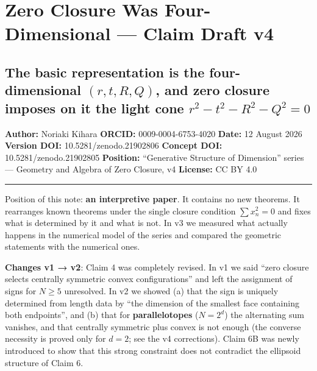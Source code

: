 \documentclass[
  10pt,
]{article}
\author{}
\date{}
\begin{document}
{
\setcounter{tocdepth}{3}
\tableofcontents
}
\section{Zero Closure Was Four-Dimensional --- Claim Draft
v4}\label{zero-closure-was-four-dimensional-claim-draft-v4}

\subsection{\texorpdfstring{The basic representation is the
four-dimensional \((r,t,R,Q)\), and zero closure imposes on it the light
cone
\(r^2-t^2-R^2-Q^2=0\)}{The basic representation is the four-dimensional (r,t,R,Q), and zero closure imposes on it the light cone r\^{}2-t\^{}2-R\^{}2-Q\^{}2=0}}\label{the-basic-representation-is-the-four-dimensional-rtrq-and-zero-closure-imposes-on-it-the-light-cone-r2-t2-r2-q20}

\textbf{Author:} Noriaki Kihara \textbf{ORCID:} 0009-0004-6753-4020
\textbf{Date:} 12 August 2026 \textbf{Version DOI:}
10.5281/zenodo.21902806 \textbf{Concept DOI:} 10.5281/zenodo.21902805
\textbf{Position:} ``Generative Structure of Dimension'' series ---
Geometry and Algebra of Zero Closure, v4 \textbf{License:} CC BY 4.0

\begin{center}\rule{0.5\linewidth}{0.5pt}\end{center}

Position of this note: \textbf{an interpretive paper}. It contains no
new theorems. It rearranges known theorems under the single closure
condition \(\sum x_n^2 = 0\) and fixes what is determined by it and what
is not. In v3 we measured what actually happens in the numerical model
of the series and compared the geometric statements with the numerical
ones.

\textbf{Changes v1 → v2}: Claim 4 was completely revised. In v1 we said
``zero closure selects centrally symmetric convex configurations'' and
left the assignment of signs for \(N\ge5\) unresolved. In v2 we showed
(a) that the sign is uniquely determined from length data by ``the
dimension of the smallest face containing both endpoints'', and (b) that
for \textbf{parallelotopes} (\(N=2^d\)) the alternating sum vanishes,
and that centrally symmetric plus convex is not enough (the converse
necessity is proved only for \(d=2\); see the v4 corrections). Claim 6B
was newly introduced to show that this strong constraint does not
contradict the ellipsoid structure of Claim 6.
\end{document}
